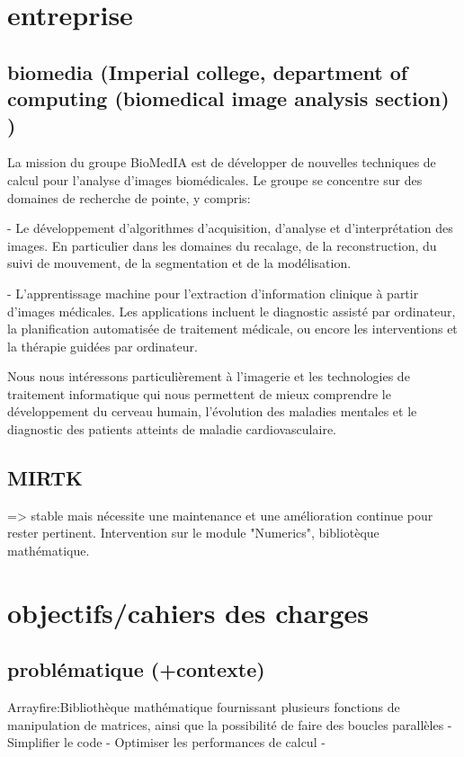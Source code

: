 \documentclass{report}
\begin{document}
\chapter{entreprise} 
	\section{biomedia (Imperial college, department of computing (biomedical image analysis section) )}

	La mission du groupe BioMedIA est de développer de nouvelles techniques de
	calcul pour l'analyse d'images biomédicales. Le groupe se concentre sur des
	domaines de recherche de pointe, y compris:

	- Le développement d'algorithmes d'acquisition, d'analyse et d'interprétation
	des images. En particulier dans les domaines du recalage, de la reconstruction,
	du suivi de mouvement, de la segmentation et de la modélisation.

	- L'apprentissage machine pour l'extraction d'information clinique à partir
	d'images médicales. Les applications incluent le diagnostic assisté par
	ordinateur, la planification automatisée de traitement médicale, ou encore les
	interventions et la thérapie guidées par ordinateur.

	Nous nous intéressons particulièrement à l'imagerie et les technologies de
	traitement informatique qui nous permettent de mieux comprendre le
	développement du cerveau humain, l’évolution des maladies mentales et le
	diagnostic des patients atteints de maladie cardiovasculaire.

	\section{MIRTK}
	 => stable mais nécessite une maintenance et une amélioration continue pour rester pertinent.
	 Intervention sur le module "Numerics", bibliotèque mathématique.
\chapter{ objectifs/cahiers des charges}
	\section{problématique (+contexte)}
	Arrayfire:Bibliothèque mathématique fournissant plusieurs fonctions de manipulation de matrices, ainsi que la possibilité de faire des boucles parallèles
	- Simplifier le code - Optimiser les performances de calcul -
\end{document}
